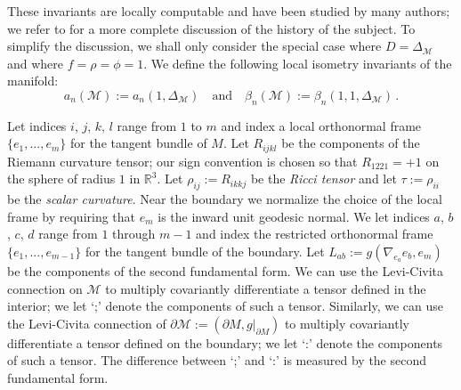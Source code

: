 \documentclass{amsart}
\begin{document}
These invariants are locally computable and have been studied by many authors;
we refer to
\cite{G04} for a more complete discussion of the history of the subject.
To simplify the discussion, we shall only consider the special case
where
$D=\Delta_{\mathcal{M}}$ and where $f=\rho=\phi=1$. We define the following local isometry invariants of the
manifold:
$$a_n(\mathcal{M}):=a_n(1,\Delta_{\mathcal{M}})\quad\text{and}\quad
\beta_n(\mathcal{M}):=\beta_n(1,1,\Delta_{\mathcal{M}})\,.
$$

Let indices $i$, $j$, $k$, $l$ range from $1$ to $m$ and index a local orthonormal
frame $\{e_1,...,e_m\}$ for the tangent bundle of $M$. Let
$R_{ijkl}$ be the components of the Riemann curvature tensor; our sign convention is chosen so that
$R_{1221}=+1$ on the sphere of radius $1$ in $\mathbb{R}^3$. Let $\rho_{ij}:=R_{ikkj}$ be the  {\it Ricci
tensor} and let
$\tau:=\rho_{ii}$ be the {\it scalar curvature}.  Near the boundary we normalize the choice of the local
frame by requiring that $e_m$ is the inward unit geodesic normal. We let indices $a$, $b$, $c$, $d$ range from
$1$ through $m-1$ and index the restricted orthonormal frame $\{e_1,...,e_{m-1}\}$ for the tangent bundle of
the boundary. Let $L_{ab}:=g(\nabla_{e_a}e_b,e_m)$ be the components of the second fundamental form. We can
use the Levi-Civita connection on $\mathcal{M}$ to multiply covariantly differentiate a tensor defined in the
interior; we let `;' denote the components of such a tensor. Similarly, we can use the Levi-Civita connection
of $\partial\mathcal{M}:=(\partial M,g|_{\partial M})$ to multiply covariantly differentiate a
tensor defined on the boundary; we let `:' denote the components of such a tensor. The difference between `;'
and `:' is measured by the second fundamental form.
\end{document}
